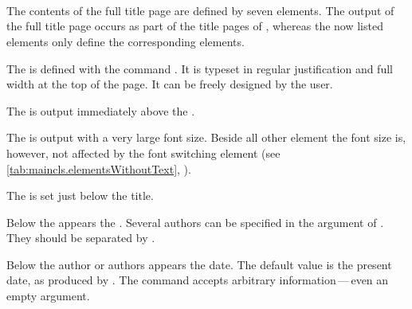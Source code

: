 \begin{Declaration}
  \\
  \\
  \\
  \\
  \\
  \\
  \\
  \\
\end{Declaration}%
%
%
%
%
%
%
%
%
%
The contents of the full title page are defined by seven elements. The output
of the full title page occurs as part of the title pages of ,
whereas the now listed elements only define the corresponding elements.

The 
 is defined with the command
. It is typeset in regular justification and full width at
the top of the page. It can be freely designed by the user.

The  is
output immediately above the .

The  is output with a very large font
size.  Beside all other element the font size is,
however, not affected by the font switching element  (see
\autoref{tab:maincls.elementsWithoutText},
).

The
 is set just below the title.

Below the  appears the
.  Several authors can be
specified in the argument of . They should be separated
by .

Below the author or authors appears the
date. The default value is the present date, as produced by
. The  command accepts arbitrary
information\,---\,even an empty argument.

